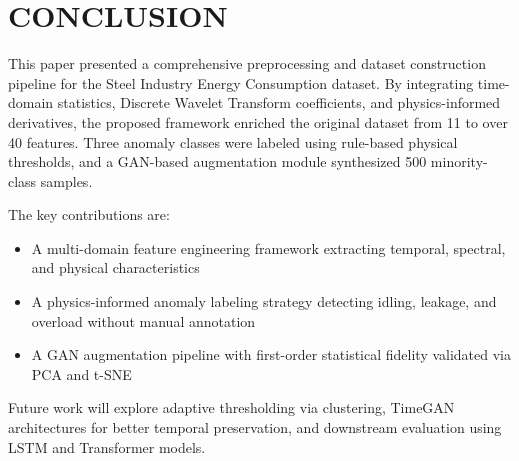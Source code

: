 \documentclass[conference]{IEEEtran}
\begin{document}
\section{CONCLUSION}
\label{sec:conclusion}

This paper presented a comprehensive preprocessing and dataset 
construction pipeline for the Steel Industry Energy Consumption 
dataset. By integrating time-domain statistics, Discrete Wavelet 
Transform coefficients, and physics-informed derivatives, the 
proposed framework enriched the original dataset from 11 to 
over 40 features. Three anomaly classes were labeled using 
rule-based physical thresholds, and a GAN-based augmentation 
module synthesized 500 minority-class samples.

The key contributions are:
\begin{itemize}
\item A multi-domain feature engineering framework extracting 
temporal, spectral, and physical characteristics
\item A physics-informed anomaly labeling strategy detecting 
idling, leakage, and overload without manual annotation
\item A GAN augmentation pipeline with first-order statistical 
fidelity validated via PCA and t-SNE
\end{itemize}

Future work will explore adaptive thresholding via clustering, 
TimeGAN architectures for better temporal preservation, and 
downstream evaluation using LSTM and Transformer models.
\end{document}
